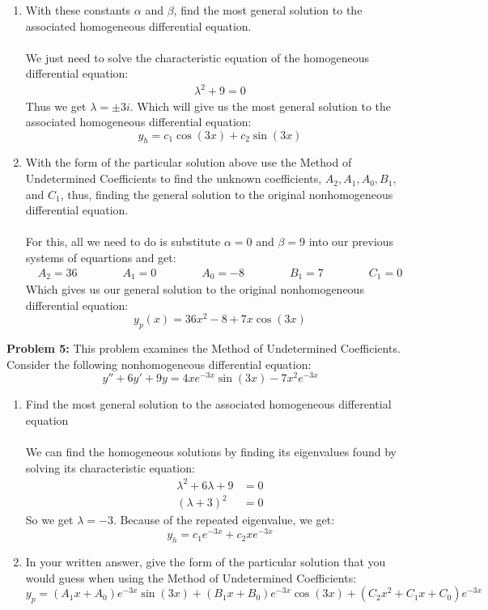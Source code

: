\documentclass[12pt]{article}
\begin{document}
\begin{enumerate}[label = (\alph*)]
		\newpage
		
		\item With these constants $\alpha$ and $\beta$, find the most general solution to the associated homogeneous differential equation.
		\\ \\
		We just need to solve the characteristic equation of the homogeneous differential equation:
			\begin{align*}
				\lambda^2 + 9 = 0
			\end{align*}
		Thus we get $\lambda = \pm 3i$.  Which will give us the most general solution to the associated homogeneous differential equation:	
			\boldmath
			$$
			y_h = c_1\cos(3x) + c_2\sin(3x)
			$$
			\unboldmath
		\item With the form of the particular solution above use the Method of Undetermined Coefficients to find the unknown coefficients, $A_2, A_1, A_0, B_1,$ and $C_1$, thus, finding the general solution to the original nonhomogeneous differential equation.
		\\ \\
		For this, all we need to do is substitute $\alpha = 0$ and $\beta = 9$ into our previous systems of equartions and get:
			\begin{align*}
				A_2 = 36 &&&&& A_1 = 0 &&&&& A_0 = -8 &&&&& B_1 = 7 &&&&& C_1 = 0
			\end{align*} 
		Which gives us our general solution to the original nonhomogeneous differential equation:
			\boldmath
			$$
			y_p(x) = 36x^2 - 8 + 7x\cos(3x) 
			$$
			\unboldmath
	\end{enumerate}

\newpage

\noindent \textbf{Problem 5: }This problem examines the Method of Undetermined Coefficients. Consider the following nonhomogeneous differential equation:
	$$
	y'' + 6y' + 9y  = 4xe^{-3x}\sin(3x) - 7x^2e^{-3x}
	$$
	\begin{enumerate}[label = (\alph*)]
		\item Find the most general solution to the associated homogeneous differential equation
		\\ \\
		We can find the homogeneous solutions by finding its eigenvalues found by solving its characteristic equation:
			\begin{align*}
				\lambda^2 + 6\lambda + 9 &= 0 \\
				(\lambda + 3)^2 &= 0
			\end{align*}
		So we get $\lambda = -3$.  Because of the repeated eigenvalue, we get:
			\boldmath
			$$
			y_h = c_1e^{-3x} + c_2xe^{-3x}
			$$
			\unboldmath
		\item In your written answer, give the form of the particular solution that you would guess when using the Method of Undetermined Coefficients:
			\boldmath
			$$
			y_p = (A_1x + A_0)e^{-3x}\sin(3x) + (B_1x + B_0)e^{-3x}\cos(3x) + (C_2x^2 + C_1x + C_0)e^{-3x}
			$$
			\unboldmath
	\end{enumerate}
\end{document}
